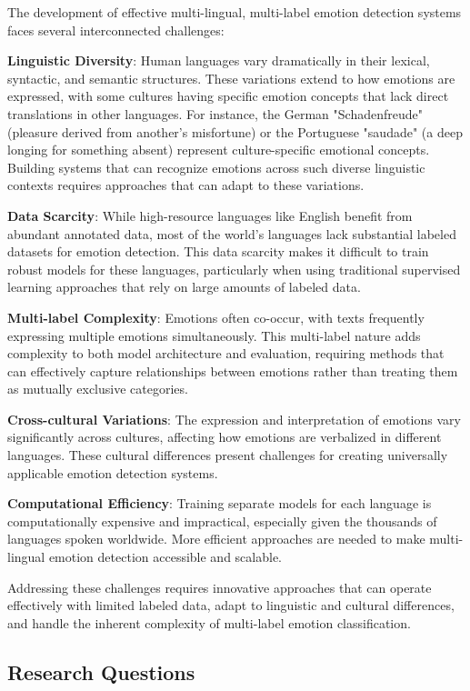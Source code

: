 \documentclass[a4paper,12pt]{extarticle}
\begin{document}
The development of effective multi-lingual, multi-label emotion detection systems faces several interconnected challenges:

\textbf{Linguistic Diversity}: Human languages vary dramatically in their lexical, syntactic, and semantic structures. These variations extend to how emotions are expressed, with some cultures having specific emotion concepts that lack direct translations in other languages. For instance, the German "Schadenfreude" (pleasure derived from another's misfortune) or the Portuguese "saudade" (a deep longing for something absent) represent culture-specific emotional concepts. Building systems that can recognize emotions across such diverse linguistic contexts requires approaches that can adapt to these variations.

\textbf{Data Scarcity}: While high-resource languages like English benefit from abundant annotated data, most of the world's languages lack substantial labeled datasets for emotion detection. This data scarcity makes it difficult to train robust models for these languages, particularly when using traditional supervised learning approaches that rely on large amounts of labeled data.

\textbf{Multi-label Complexity}: Emotions often co-occur, with texts frequently expressing multiple emotions simultaneously. This multi-label nature adds complexity to both model architecture and evaluation, requiring methods that can effectively capture relationships between emotions rather than treating them as mutually exclusive categories.

\textbf{Cross-cultural Variations}: The expression and interpretation of emotions vary significantly across cultures, affecting how emotions are verbalized in different languages. These cultural differences present challenges for creating universally applicable emotion detection systems.

\textbf{Computational Efficiency}: Training separate models for each language is computationally expensive and impractical, especially given the thousands of languages spoken worldwide. More efficient approaches are needed to make multi-lingual emotion detection accessible and scalable.

Addressing these challenges requires innovative approaches that can operate effectively with limited labeled data, adapt to linguistic and cultural differences, and handle the inherent complexity of multi-label emotion classification.

\subsection{Research Questions}
\end{document}

